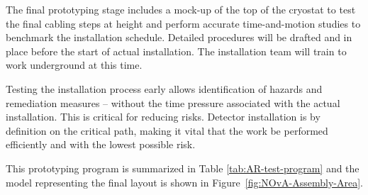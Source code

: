 The final prototyping stage includes a mock-up of the top of the cryostat to test the final cabling steps at height and perform  accurate time-and-motion studies to benchmark the installation schedule. Detailed procedures will be drafted and in place before the start of actual installation. The installation team will train to work underground at this time.

Testing the installation process early allows identification of  hazards and remediation measures -- without the time pressure associated with the actual installation. This is critical for reducing risks.  Detector installation is by definition on the critical path, making it vital that the work be performed efficiently and with the lowest possible risk. 

This prototyping program is summarized in Table \ref{tab:AR-test-program} and the \threed model representing the final layout is shown in Figure~\ref{fig:NOvA-Assembly-Area}. 

